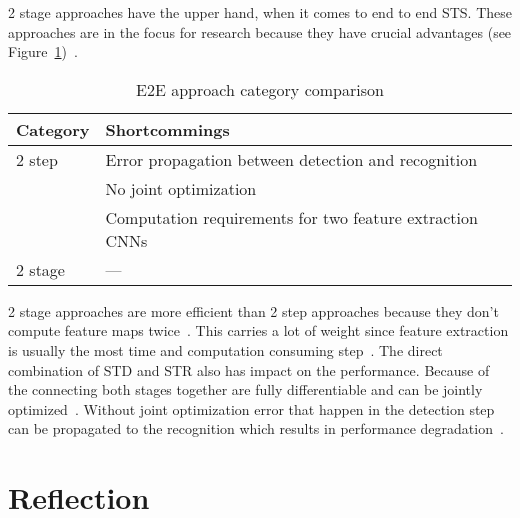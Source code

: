 2 stage approaches have the upper hand, when it comes to end to end \ac{STS}.
These approaches are in the focus for research because they have crucial
advantages (see Figure~\ref{tb:E2E-comparison})~\citep{chen_text_2021}.
\begin{table}[h]
    \centering\scriptsize%
    \begin{tabular}{p{}p{}}
        \textbf{Category} & \textbf{Shortcommings} \\
        \toprule
        2 step & Error propagation between detection and
            recognition~\citep{chen_text_2021,long_scene_2021}\\
        & No joint optimization~\citep{qiao_text_2021, chen_text_2021}\\
        & Computation requirements for two feature extraction
            CNNs~\citep{liu_fots_2018,chen_text_2021} \\
        2 stage & --- \\
        \bottomrule
    \end{tabular}
    \caption{E2E approach category comparison\label{tb:E2E-comparison}}
\end{table}
2 stage approaches are more efficient than 2 step approaches because they don't compute feature maps
twice~\citep{liu_fots_2018,chen_text_2021}.
This carries a lot of weight since feature extraction is usually the most time and computation
consuming step~\citep{liu_fots_2018}.
The direct combination of \ac{STD} and \ac{STR} also has impact on the performance.
Because of the connecting both stages together are fully differentiable and can be jointly
optimized~\citep{chen_text_2021,long_scene_2021,qiao_text_2021}.
Without joint optimization error that happen in the detection step can be propagated to the
recognition which results in performance degradation~\citep{chen_text_2021,qiao_text_2021}.

\section{Reflection}
